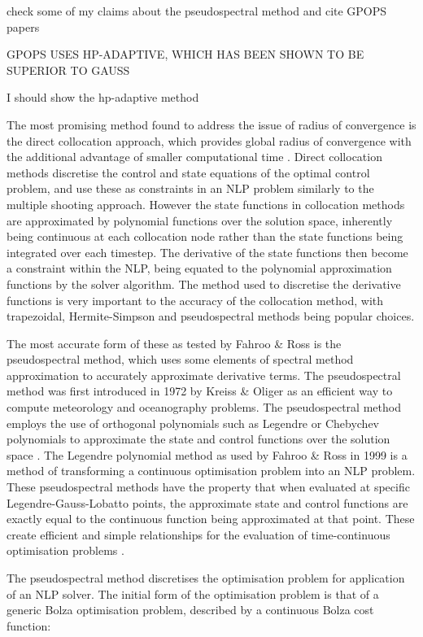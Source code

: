 check some of my claims about the pseudospectral method and cite GPOPS papers

GPOPS USES HP-ADAPTIVE, WHICH HAS BEEN SHOWN TO BE SUPERIOR TO GAUSS

I should show the hp-adaptive method

The most promising method found to address the issue of radius of convergence is the direct collocation approach, which provides global radius of convergence with the additional advantage of smaller computational time \cite{Fasano2013}. Direct collocation methods discretise the control and state equations of the optimal control problem, and use these as constraints in an NLP problem similarly to the multiple shooting approach. However the state functions in collocation methods are approximated by polynomial functions over the solution space, inherently being continuous at each collocation node rather than the state functions being integrated over each timestep. The derivative of the state functions then become a constraint within the NLP, being equated to the polynomial approximation functions by the solver algorithm. The method used to discretise the derivative functions is very important to the accuracy of the collocation method, with trapezoidal, Hermite-Simpson and pseudospectral methods being popular choices.


The most accurate form of these as tested by Fahroo \& Ross \cite{Fahroo2000} is the pseudospectral method, which uses some elements of spectral method approximation to accurately approximate derivative terms. The pseudospectral method was first introduced in 1972 by Kreiss \& Oliger \cite{Kreiss1972} as an efficient way to compute meteorology and oceanography problems. The pseudospectral method employs the use of orthogonal polynomials such as Legendre or Chebychev polynomials to approximate the state and control functions over the solution space \cite{Fahroo2000}. The Legendre polynomial method as used by Fahroo \& Ross in 1999 \cite{Fahroo1999} is a method of transforming a continuous optimisation problem into an NLP problem. These pseudospectral methods have the property that when evaluated at specific Legendre-Gauss-Lobatto points, the approximate state and control functions are exactly equal to the continuous function being approximated at that point. These create efficient and simple relationships for the evaluation of time-continuous optimisation problems \cite{Fahroo2000}.  

The pseudospectral method discretises the optimisation problem for application of an NLP solver. The initial form of the optimisation problem is that of a generic Bolza optimisation problem, described by a continuous Bolza cost function:

